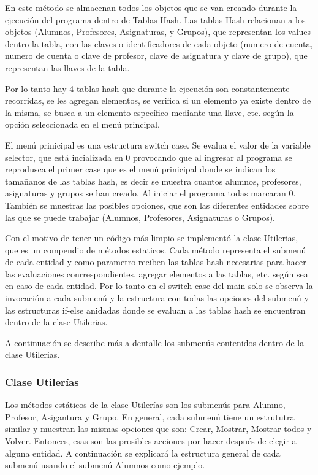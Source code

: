 \documentclass[12pt, letterpaper]{report}
\begin{document}
En este método se almacenan todos los objetos que se van creando durante la ejecución del programa dentro de Tablas Hash. Las tablas Hash relacionan a los objetos (Alumnos, Profesores, Asignaturas, y Grupos), que representan los values dentro la tabla, con las claves o identificadores de cada objeto (numero de cuenta, numero de cuenta o clave de profesor, clave de asignatura y clave de grupo), que representan las llaves de la tabla. 

Por lo tanto hay 4 tablas hash que durante la ejecución son constantemente recorridas, se les agregan elementos, se verifica si un elemento ya existe dentro de la misma, se busca a un elemento específico mediante una llave, etc. según la opción seleccionada en el menú principal.

El menú prinicipal es una estructura switch case. Se evalua el valor de la variable selector, que está incializada en 0 provocando que al ingresar al programa se reprodusca el primer case que es el menú prinicipal donde se indican los tamañanos de las tablas hash, es decir se muestra cuantos alumnos, profesores, asignaturas y grupos se han creado. Al iniciar el programa todas marcaran 0. También se muestras las posibles opciones, que son las diferentes entidades sobre las que se puede trabajar (Alumnos, Profesores, Asignaturas o Grupos). 

Con el motivo de tener un código más limpio se implementó la clase Utilerias, que es un compendio de métodos estaticos. Cada método representa el submenú de cada entidad y como parametro reciben las tablas hash necesarias para hacer las evaluaciones conrrespondientes, agregar elementos a las tablas, etc. según sea en caso de cada entidad. Por lo tanto en el switch case del main solo se observa la invocación a cada submenú y la estructura con todas las opciones del submenú y las estructuras if-else anidadas donde se evaluan a las tablas hash se encuentran dentro de la clase Utilerias. 

A continuación se describe más a dentalle los submenús contenidos dentro de la clase Utilerias.

\subsubsection*{Clase Utilerías}
Los métodos estáticos de la clase Utilerías son los submenús para Alumno, Profesor, Asigantura y Grupo. En general, cada submenú tiene un estrututra similar y muestran las mismas opciones que son: Crear, Mostrar, Mostrar todos y Volver. Entonces, esas son las prosibles acciones por hacer después de elegir a alguna entidad. A continuación se explicará la estructura general de cada submenú usando el submenú Alumnos como ejemplo. 
\end{document}
